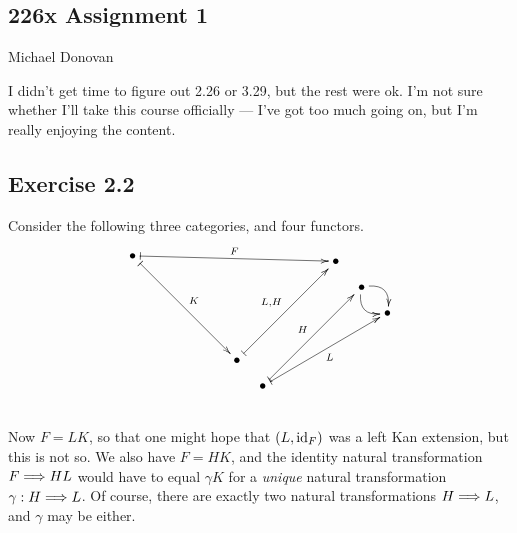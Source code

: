 \documentclass[11pt]{article}
\begin{document}
\begin{solutions}

\section*{226x Assignment 1}
\begin{flushright}
Michael Donovan
\end{flushright}
I didn't get time to figure out 2.26 or 3.29, but the rest were ok. I'm not sure whether I'll take this course officially --- I've got too much going on, but I'm really enjoying the content.
\subsection*{Exercise 2.2}
Consider the following three categories, and four functors.
\[\xymatrix@R=.4cm@C=3cm@ur{
\bullet\ar@{|->}[ddddd]^K\ar@{|->}[dddrdd]^F
\\\\\\
\\
\\
\bullet\ar@{|->}[r]^-{L,H}&%
\bullet\\%
\bullet\ar@{|->}[r]^-{H}\ar@{|->}[dr]_-{L}&%
\bullet\ar@/^1em/[d]\ar@/_1em/[d]\\%
&%
\bullet
}\]
Now $F=LK$, so that one might hope that $(L,\textup{id}_F)$ was a left Kan extension, but this is not so. We also have $F=HK$, and the identity natural transformation $F\Longrightarrow HL$ would have to equal $\gamma K$ for a \emph{unique} natural transformation $\gamma:H\Longrightarrow L$. Of course, there are exactly two natural transformations $H\Longrightarrow L$, and $\gamma$ may be either.

\end{solutions}
\end{document}
